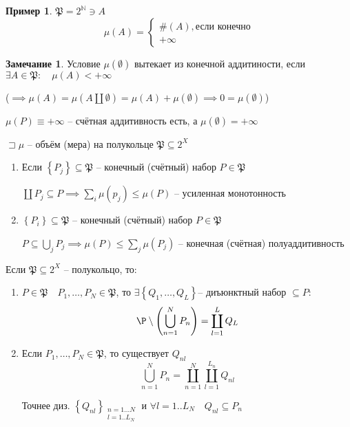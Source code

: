 \documentclass{book}
\newcommand\N{\ensuremath{\mathbb{N}}}
\renewcommand\O{\ensuremath{\emptyset}}
\theoremstyle{definition}
\newtheorem*{note}{Замечание}
\newtheorem*{example}{Пример}
\begin{document}
\begin{example}
    $\mathfrak P = 2^\N \ni A$ \[\mu(A) = \begin{cases}
        \#(A) ,\text{если конечно}\\
        +\infty 
    \end{cases}\]
\end{example}

\begin{note}
    Условие $\mu(\O )$ вытекает  из конечной аддитиности, если $\exists A\in \mathfrak P:\quad\mu(A) < +\infty $ 

    ($\implies \mu(A) = \mu\left( A \coprod \O  \right) = \mu(A) + \mu(\O ) \implies 0 = \mu(\O ) $)

    $\mu(P) \equiv +\infty $ -- счётная аддитивность есть, а $\mu(\O ) = +\infty $
\end{note}

\begin{theorem}

    $\sqsupset \mu$ -- объём (мера) на полукольце  $\mathfrak P \subseteq 2^X$

    \begin{enumerate}
        \item Если $ \left\{ P_j \right\} \subseteq \mathfrak P $ -- конечный (счётный) набор $P\in \mathfrak P$

            $\coprod P_j \subseteq P \implies \sum_i \mu(p_j) \leqslant \mu(P)$ -- усиленная монотонность
        \item $\left\{ P_i \right\} \subseteq \mathfrak P$ -- конечный (счётный) набор $P\in\mathfrak P$

            $P\subseteq \bigcup\limits_{j} P_j \implies \mu(P) \leqslant \sum_j \mu(P_j)$ -- конечная (счётная) полуаддитивность
    \end{enumerate}
\end{theorem}

\begin{statement}
    Если $\mathfrak P\subseteq 2^X$ -- полукольцо, то:
    \begin{enumerate}
        \item $P\in \mathfrak P\quad P_1, \ldots, P_N\in \mathfrak P$, то $\exists \left\{ Q_1, \ldots, Q_L \right\} $-- диъюнктный набор $\subseteq P:$ \[\P\setminus \left( \bigcup\limits_{n=1}^N P_n  \right) = \coprod _{l=1}^L Q_L \]
        \item Если $P_1, \ldots, P_N\in \mathfrak P$, то существует $Q_{nl}$ \[\bigcup\limits_{n=1}^N P_n = \coprod_{n=1}^N\coprod _{l=1}^{L_n} Q_{nl} \] 
            
            Точнее диз. $\left\{ Q_{nl} \right\} _{\substack{n = 1 \ldots N\\ l = 1 .. L_N}}$ и $\forall l = 1 .. L_N\quad Q_{nl}\subseteq P_n$
    \end{enumerate}
\end{statement}
\end{document}
